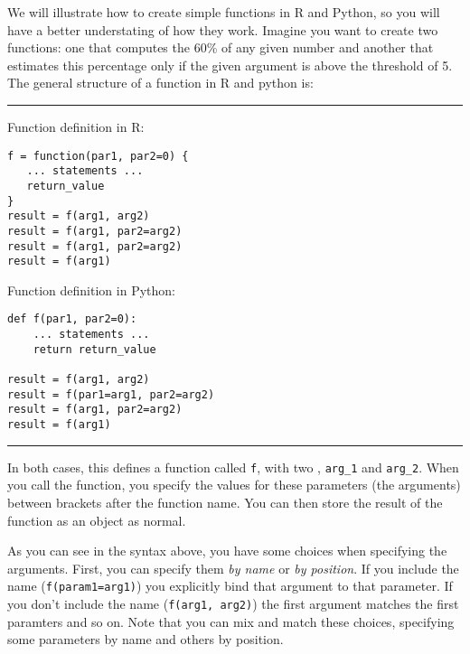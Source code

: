 
We will illustrate how to create simple functions in R and Python, so you
will have a better understating of how they work. Imagine you want to
create two functions: one that computes the 60\% of any given number
and another that estimates this percentage only if the given argument
is above the threshold of 5.
The general structure of a function in R and python is:

\noindent\rule{\textwidth}{.5pt}\vspace{-1em}

\noindent\begin{minipage}[t]{.5\textwidth}
  Function definition in R:
\begin{verbatim}
f = function(par1, par2=0) {
   ... statements ... 
   return_value
}
result = f(arg1, arg2)
result = f(arg1, par2=arg2)
result = f(arg1, par2=arg2)
result = f(arg1)
\end{verbatim}
\end{minipage}
\begin{minipage}[t]{.45\textwidth}
  Function definition in Python:
\begin{verbatim}
def f(par1, par2=0):
    ... statements ...
    return return_value   

result = f(arg1, arg2)
result = f(par1=arg1, par2=arg2)
result = f(arg1, par2=arg2)
result = f(arg1)
\end{verbatim}
\end{minipage}
\vspace{.5em}

\noindent\rule{\textwidth}{.5pt}

In both cases, this defines a function called \verb|f|,
with two , \verb|arg_1| and \verb|arg_2|.
When you call the function, you specify the values for these parameters (the arguments) between brackets after the function name.
You can then store the result of the function as an object as normal.

As you can see in the syntax above, you have some choices when specifying the arguments.
First, you can specify them \emph{by name} or \emph{by position}.
If you include the name (\verb|f(param1=arg1)|) you explicitly bind that argument to that parameter.
If you don't include the name (\verb|f(arg1, arg2)|) the first argument matches the first paramters and so on.
Note that you can mix and match these choices, specifying some parameters by name and others by position.

